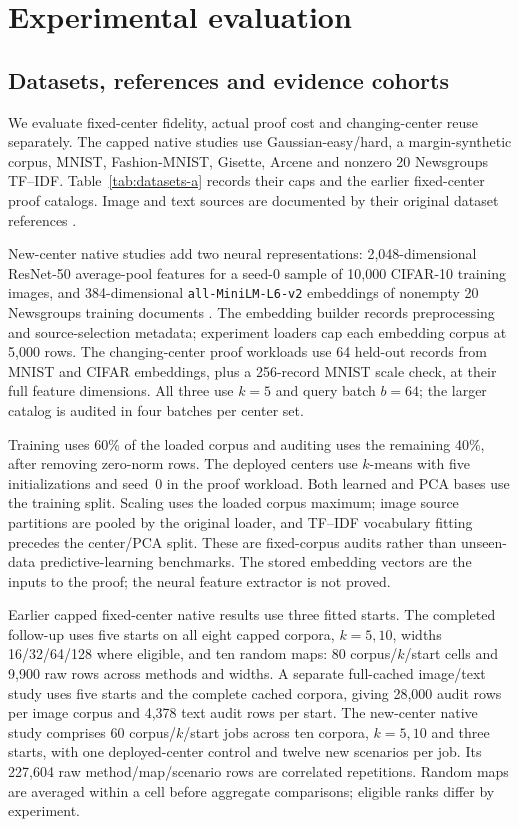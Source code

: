 \section{Experimental evaluation}\label{sec:method}
\subsection{Datasets, references and evidence cohorts}
We evaluate fixed-center fidelity, actual proof cost and changing-center reuse separately. The capped native studies use Gaussian-easy/hard, a margin-synthetic corpus, MNIST, Fashion-MNIST, Gisette, Arcene and nonzero 20 Newsgroups TF--IDF. Table~\ref{tab:datasets-a} records their caps and the earlier fixed-center proof catalogs. Image and text sources are documented by their original dataset references \cite{lecun1998,fashion2017,gisette2004,arcene2004,news20data}.


New-center native studies add two neural representations: 2,048-dimensional ResNet-50 average-pool features for a seed-0 sample of 10,000 CIFAR-10 training images, and 384-dimensional \texttt{all-MiniLM-L6-v2} embeddings of nonempty 20 Newsgroups training documents \cite{krizhevsky2009cifar,he2016resnet,reimers2019sbert,minilmv2model}. The embedding builder records preprocessing and source-selection metadata; experiment loaders cap each embedding corpus at 5,000 rows. The changing-center proof workloads use 64 held-out records from MNIST and CIFAR embeddings, plus a 256-record MNIST scale check, at their full feature dimensions. All three use $k=5$ and query batch $b=64$; the larger catalog is audited in four batches per center set.

Training uses 60\% of the loaded corpus and auditing uses the remaining 40\%, after removing zero-norm rows. The deployed centers use $k$-means with five initializations and seed~0 in the proof workload. Both learned and PCA bases use the training split. Scaling uses the loaded corpus maximum; image source partitions are pooled by the original loader, and TF--IDF vocabulary fitting precedes the center/PCA split. These are fixed-corpus audits rather than unseen-data predictive-learning benchmarks. The stored embedding vectors are the inputs to the proof; the neural feature extractor is not proved.

Earlier capped fixed-center native results use three fitted starts. The completed follow-up uses five starts on all eight capped corpora, $k=5,10$, widths 16/32/64/128 where eligible, and ten random maps: 80 corpus/$k$/start cells and 9,900 raw rows across methods and widths. A separate full-cached image/text study uses five starts and the complete cached corpora, giving 28,000 audit rows per image corpus and 4,378 text audit rows per start. The new-center native study comprises 60 corpus/$k$/start jobs across ten corpora, $k=5,10$ and three starts, with one deployed-center control and twelve new scenarios per job. Its 227,604 raw method/map/scenario rows are correlated repetitions. Random maps are averaged within a cell before aggregate comparisons; eligible ranks differ by experiment.

